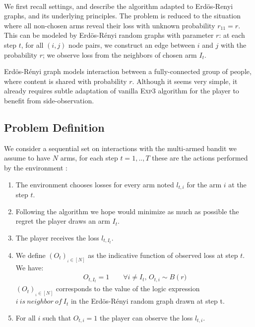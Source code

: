 \documentclass[11pt,a4paper]{article}
\begin{document}
\paragraph{}We first recall \cite{valko} settings, and describe the algorithm adapted to Erdös-Renyi graphs, and its underlying principles. The problem is reduced to the situation where all non-chosen arms reveal their loss with unknown probability $r_{11}=r$. This can be modeled by Erdös-Rényi random graphs with parameter $r$: at each step $t$, for all $(i,j)$ node pairs, we construct an edge between $i$ and $j$ with the probability $r$; we observe loss from the neighbors of chosen arm $I_t$.

Erdös-Rényi graph models interaction between a fully-connected group of people, where content is shared with probability $r$. Although it seems very simple, it already requires subtle adaptation of vanilla \textsc{Exp3} algorithm for the player to benefit from side-observation.

\subsection{Problem Definition}
We consider a sequential set on interactions with the multi-armed bandit we assume to have $N$ arms, for each step $t=1,..,T$ these are the actions performed by the environment : 
\begin{enumerate}
\item The environment chooses losses for every arm noted $l_{t,i}$ for the arm $i$ at the step $t$.
\item Following the algorithm we hope would minimize as much as possible the regret the player draws an arm $I_t$.
\item The player receives the loss $l_{t,I_t}$.
\item We define $\left(O_t\right)_{_i\in\left[N\right]}$ as the indicative function of observed loss at step $t$. We have:
\begin{align*}
O_{t,I_t}=1 \qquad \forall i \neq I_t,\, O_{t,i} \sim B\left(r\right.)
\end{align*}
$\left(O_t\right)_{_i\in\left[N\right]}$ corresponds to the value of the logic expression $ i \ is\ neighbor\ of\ I_t$ in the Erdös-Rényi random graph drawn at step t.
\item For all $i$ such that $O_{t,i}=1$ the player can observe the loss $l_{t,i}$.
\end{enumerate}
 
\end{document}

